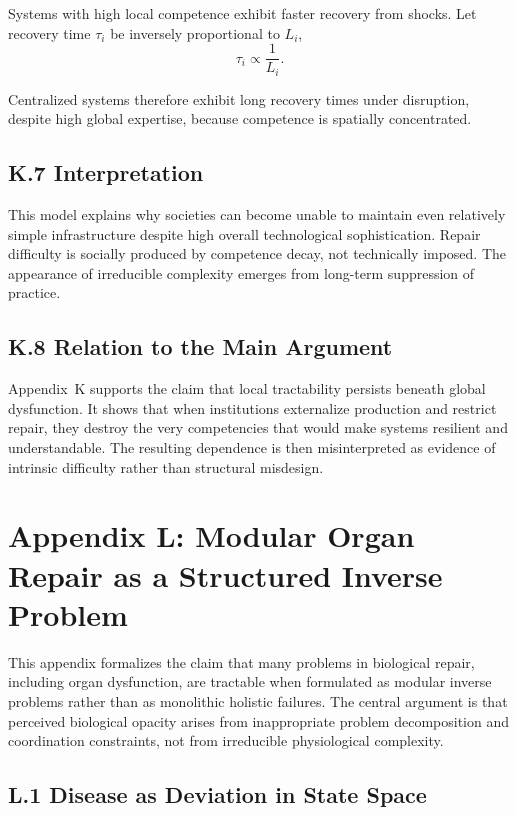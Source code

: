 \documentclass[11pt]{article}
\begin{document}
Systems with high local competence exhibit faster recovery from shocks. Let recovery time \(\tau_i\) be inversely proportional to \(L_i\),
\[
\tau_i \propto \frac{1}{L_i}.
\]

Centralized systems therefore exhibit long recovery times under disruption, despite high global expertise, because competence is spatially concentrated.

\subsection{K.7 Interpretation}

This model explains why societies can become unable to maintain even relatively simple infrastructure despite high overall technological sophistication. Repair difficulty is socially produced by competence decay, not technically imposed. The appearance of irreducible complexity emerges from long-term suppression of practice.

\subsection{K.8 Relation to the Main Argument}

Appendix~K supports the claim that local tractability persists beneath global dysfunction. It shows that when institutions externalize production and restrict repair, they destroy the very competencies that would make systems resilient and understandable. The resulting dependence is then misinterpreted as evidence of intrinsic difficulty rather than structural misdesign.

\section{Appendix L: Modular Organ Repair as a Structured Inverse Problem}
\label{app:organ-detailed}

This appendix formalizes the claim that many problems in biological repair, including organ dysfunction, are tractable when formulated as modular inverse problems rather than as monolithic holistic failures. The central argument is that perceived biological opacity arises from inappropriate problem decomposition and coordination constraints, not from irreducible physiological complexity.

\subsection{L.1 Disease as Deviation in State Space}
\end{document}
